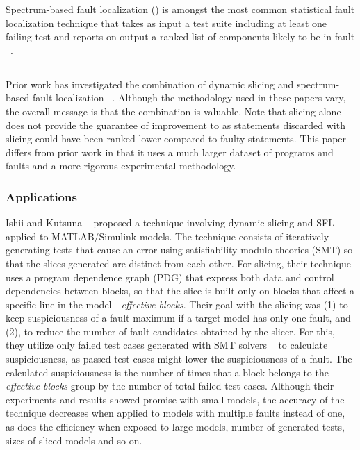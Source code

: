 \documentclass{article}
\begin{document}
Spectrum-based fault localization (\sfl) is amongst the most common statistical
fault localization technique that takes as input a test suite including at least
one failing test and reports on output a ranked list of components likely to be
in fault ~\cite{FLSurvey2016,DBLP:conf/kbse/JonesH05,DBLP:journals/smr/LuciaLJTB14,DBLP:journals/jss/AbreuZGG09}.

\subsection{\comb{}}

Prior work has investigated the combination of dynamic slicing and
spectrum-based fault
localization ~\cite{Wotawa:2010:FLB:1848650.1849235,Alves:2011:FUD:2190078.2190115,DBLP:conf/ecai/HoferW12,lei-mao-dai-wang-2012,slicing-sfl-repair}. Although
the methodology used in these papers vary, the overall message is that
the combination is valuable. Note that slicing alone does not provide
the guarantee of improvement to \sfl{} as statements discarded with
slicing could have been ranked lower compared to faulty
statements. This paper differs from prior work in that it uses a much
larger dataset of programs and faults and a more rigorous experimental
methodology.


\subsubsection{Applications}

Ishii and Kutsuna ~\cite{li-huo-chen-zhong-feng-li-2013} proposed a
technique involving dynamic slicing and SFL applied to MATLAB/Simulink
models. The technique consists of iteratively
generating tests that cause an error using satisfiability modulo
theories (SMT) so that the slices generated are distinct from each
other.  For slicing, their technique uses a program dependence graph
(PDG) that express both data and control dependencies between blocks,
so that the slice is built only on blocks that affect a specific line
in the model - \textit{effective blocks}.  Their goal with the slicing
was (1) to keep suspiciousness of a fault maximum if a target model
has only one fault, and (2), to reduce the number of fault candidates
obtained by the slicer.  For this, they utilize only failed test cases
generated with SMT solvers ~\cite{peleska-vorobev-lapschies-2011} to
calculate suspiciousness, as passed test cases might lower the
suspiciousness of a fault.  The calculated suspiciousness is the
number of times that a block belongs to the \textit{effective blocks}
group by the number of total failed test cases.  Although their
experiments and results showed promise with small models, the accuracy
of the technique decreases when applied to models with multiple faults
instead of one, as does the efficiency when exposed to large models,
number of generated tests, sizes of sliced models and so on.
\end{document}
